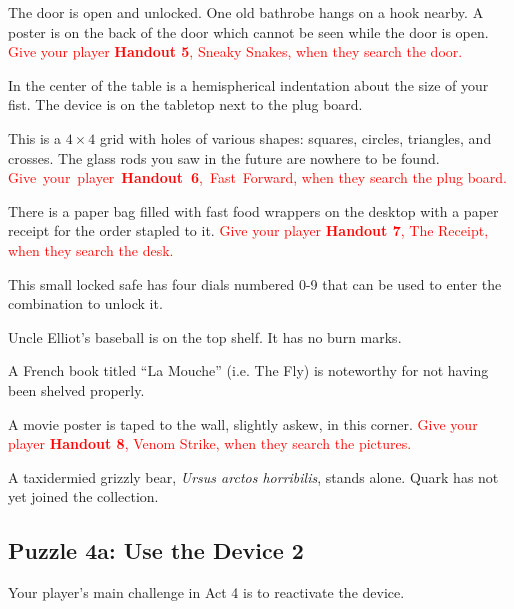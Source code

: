 \documentclass[a6paper, parskip=half, DIV=14, 12pt]{scrartcl}
\begin{document}
\begin{description}[leftmargin=0pt]
\item[Door (E)] The door is open and unlocked. One old bathrobe hangs on a hook nearby. A poster is on the back of the door which cannot be seen while the door is open.
\textcolor{Red}{Give your player \textbf{Handout 5}, Sneaky Snakes, when they search the door.}

\item[Table (C)] In the center of the table is a hemispherical indentation about the size of your fist. The device is on the tabletop next to the plug board.

\item[Plug Board (C)] This is a $4 \times 4$ grid with holes of various shapes: squares, circles, triangles, and crosses. The glass rods you saw in the future are nowhere to be found.
\textcolor{Red}{Give~your~player~\textbf{Handout~6},~Fast~Forward, when they search the plug board.}

\item[Desk (W)] There is a paper bag filled with fast food wrappers on the desktop  with a paper receipt for the order stapled to it.
\textcolor{Red}{Give your player \textbf{Handout 7}, The Receipt, when they search the desk.}

\item[Safe (W)] This small locked safe has four dials numbered 0-9 that can be used to enter the combination to unlock it.

\item[Shelves (NW)] Uncle Elliot's baseball is on the top shelf. It has no burn marks.

\item[Bookcases (NE)] A French book titled ``La Mouche'' (i.e. The Fly) is noteworthy for not having been shelved properly.

\item[Pictures (SE)] A movie poster is taped to the wall, slightly askew, in this corner.
\textcolor{Red}{Give your player \textbf{Handout 8}, Venom Strike, when they search the pictures.}

\item[Animals (SW)] A taxidermied grizzly bear, \textit{Ursus arctos horribilis}, stands alone. Quark has not yet joined the collection.

\end{description}

\newpage

\subsection*{Puzzle 4a: Use the Device 2}
Your player's main challenge in Act 4 is to reactivate the device.
\end{document}

